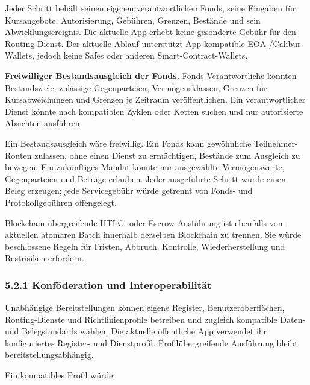 \documentclass[11pt]{article}
\begin{document}
Jeder Schritt behält seinen eigenen verantwortlichen Fonds, seine Eingaben für Kursangebote, Autorisierung, Gebühren, Grenzen, Bestände und sein Abwicklungsereignis. Die aktuelle App erhebt keine gesonderte Gebühr für den Routing-Dienst. Der aktuelle Ablauf unterstützt App-kompatible EOA-/Calibur-Wallets, jedoch keine Safes oder anderen Smart-Contract-Wallets.

\textbf{Freiwilliger Bestandsausgleich der Fonds.} Fonds-Verantwortliche könnten Bestandsziele, zulässige Gegenparteien, Vermögensklassen, Grenzen für Kursabweichungen und Grenzen je Zeitraum veröffentlichen. Ein verantwortlicher Dienst könnte nach kompatiblen Zyklen oder Ketten suchen und nur autorisierte Absichten ausführen.

Ein Bestandsausgleich wäre freiwillig. Ein Fonds kann gewöhnliche Teilnehmer-Routen zulassen, ohne einen Dienst zu ermächtigen, Bestände zum Ausgleich zu bewegen. Ein zukünftiges Mandat könnte nur ausgewählte Vermögenswerte, Gegenparteien und Beträge erlauben. Jeder ausgeführte Schritt würde einen Beleg erzeugen; jede Servicegebühr würde getrennt von Fonds- und Protokollgebühren offengelegt.

Blockchain-übergreifende HTLC- oder Escrow-Ausführung ist ebenfalls vom aktuellen atomaren Batch innerhalb derselben Blockchain zu trennen. Sie würde beschlossene Regeln für Fristen, Abbruch, Kontrolle, Wiederherstellung und Restrisiken erfordern.

\subsubsection*{5.2.1 Konföderation und Interoperabilität}

Unabhängige Bereitstellungen können eigene Register, Benutzeroberflächen, Routing-Dienste und Richtlinienprofile betreiben und zugleich kompatible Daten- und Belegstandards wählen. Die aktuelle öffentliche App verwendet ihr konfiguriertes Register- und Dienstprofil. Profilübergreifende Ausführung bleibt bereitstellungsabhängig.

Ein kompatibles Profil würde:
\end{document}
